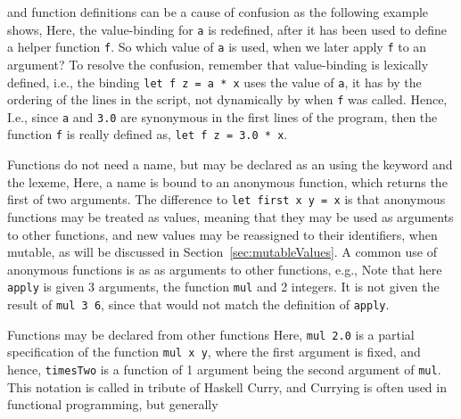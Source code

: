  and function definitions can be a cause of confusion as the following example shows,
%
%
Here, the value-binding for \lstinline!a! is redefined, after it has been used to define a helper function \lstinline!f!. So which value of \lstinline!a! is used, when we later apply \lstinline!f! to an argument? To resolve the confusion, remember that value-binding is lexically defined, i.e., the binding \lstinline!let f z = a * x! uses the value of \lstinline!a!, it has by the ordering of the lines in the script, not dynamically by when \lstinline!f! was called. Hence,  I.e., since \lstinline!a! and \lstinline!3.0! are synonymous in the first lines of the program, then the function \lstinline!f! is really defined as, \lstinline!let f z = 3.0 * x!.

Functions do not need a name, but may be declared as an  using the  keyword and the \lexeme{->} lexeme,
%
%
Here, a name is bound to an anonymous function, which returns the first of two arguments. The difference to \lstinline!let first x y = x! is that anonymous functions may be treated as values, meaning that they may be used as arguments to other functions, and new values may be reassigned to their identifiers, when mutable, as will be discussed in Section~\ref{sec:mutableValues}. A common use of anonymous functions is as as arguments to other functions, e.g.,
%
%
Note that here \lstinline!apply! is given 3 arguments, the function \lstinline!mul! and 2 integers. It is not given the result of \lstinline!mul 3 6!, since that would not match the definition of \lstinline!apply!. 

Functions may be declared from other functions
%
%
Here, \lstinline{mul 2.0} is a partial specification of the function \lstinline{mul x y}, where the first argument is fixed, and hence, \lstinline{timesTwo} is a function of 1 argument being the second argument of \lstinline{mul}. This notation is called  in tribute of Haskell Curry, and Currying is often used in functional programming, but generally 

